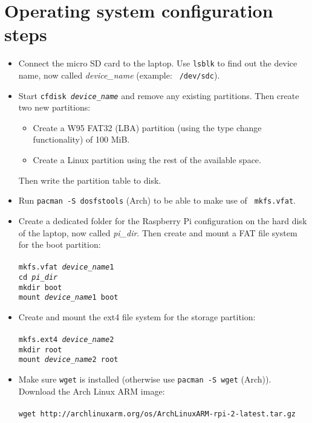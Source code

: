 \documentclass{article}
\newcommand{\arch}{{\color{red} (Arch)}}
\begin{document}
\section{Operating system configuration steps}
\begin{itemize}
    \item Connect the micro SD card to the laptop. Use {\tt lsblk} to find out 
          the device name, now called \emph{device\_name} (example: {\tt 
          /dev/sdc}).
    \item Start {\tt cfdisk \emph{device\_name}} and remove any existing 
          partitions. Then create two new partitions:
          \begin{itemize}
              \item Create a W95 FAT32 (LBA) partition (using the type change 
                    functionality) of 100 MiB.
              \item Create a Linux partition using the rest of the available 
                    space.
          \end{itemize}
          Then write the partition table to disk.
    \item Run {\tt pacman -S dosfstools} \arch{} to be able to make use of {\tt 
          mkfs.vfat}.
    \item Create a dedicated folder for the Raspberry Pi configuration on the 
          hard disk of the laptop, now called \emph{pi\_dir}.
          Then create and mount a FAT file system for the boot partition: \\\\
          {\tt mkfs.vfat \emph{device\_name}1} \\
          {\tt cd \emph{pi\_dir}} \\
          {\tt mkdir boot} \\
          {\tt mount \emph{device\_name}1 boot}
    \item Create and mount the ext4 file system for the storage partition: \\\\
          {\tt mkfs.ext4 \emph{device\_name}2} \\
          {\tt mkdir root} \\
          {\tt mount \emph{device\_name}2 root}
    \item Make sure {\tt wget} is installed (otherwise use {\tt pacman -S wget} 
          \arch{}). Download the Arch Linux ARM image: \\\\
          {\tt wget 
          http://archlinuxarm.org/os/ArchLinuxARM-rpi-2-latest.tar.gz}

\end{itemize}
\end{document}

